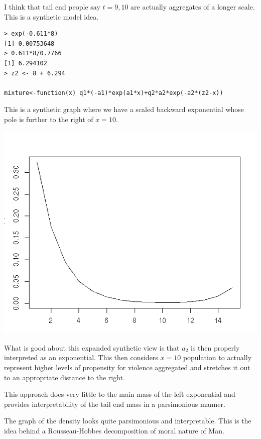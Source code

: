 \documentclass{amsart}
\begin{document}
I think that tail end people say $t=9,10$ are actually aggregates of a longer scale.  This is a synthetic model idea.

\begin{verbatim}
> exp(-0.611*8)
[1] 0.00753648
> 0.611*8/0.7766
[1] 6.294102
> z2 <- 8 + 6.294

mixture<-function(x) q1*(-a1)*exp(a1*x)+q2*a2*exp(-a2*(z2-x))

\end{verbatim}

This is a synthetic graph where we have a scaled backward exponential whose pole is further to the right of $x=10$. 

\includegraphics[scale=0.8]{synthterror.jpeg}

What is good about this expanded synthetic view is that $a_2$ is then properly interpreted as an exponential.  This then considers $x=10$ population to actually represent higher levels of propensity for violence aggregated and stretches it out to an appropriate distance to the right.

This approach does very little to the main mass of the left exponential and provides interpretability of the tail end mass in a parsimonious manner.

The graph of the density looks quite parsimonious and interpretable.  This is the idea behind a Rousseau-Hobbes decomposition of moral nature of Man.



 
\end{document}
